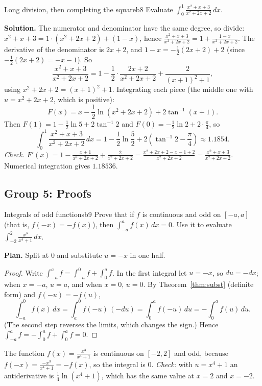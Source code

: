\documentclass[11pt]{article}
\begin{document}
\begin{exmp}{Long division, then completing the square}{b8}
Evaluate $\int_0^1\frac{x^2+x+3}{x^2+2x+2}\,dx$.

\textbf{Solution.} The numerator and denominator have the same degree, so divide: $x^2+x+3=1\cdot(x^2+2x+2)+(1-x)$, hence $\frac{x^2+x+3}{x^2+2x+2}=1+\frac{1-x}{x^2+2x+2}$. The derivative of the denominator is $2x+2$, and $1-x=-\frac12(2x+2)+2$ (since $-\frac12(2x+2)=-x-1$). So
\[\frac{x^2+x+3}{x^2+2x+2}=1-\frac12\cdot\frac{2x+2}{x^2+2x+2}+\frac2{(x+1)^2+1},\]
using $x^2+2x+2=(x+1)^2+1$. Integrating each piece (the middle one with $u=x^2+2x+2$, which is positive):
\[F(x)=x-\frac12\ln(x^2+2x+2)+2\tan^{-1}(x+1).\]
Then $F(1)=1-\frac12\ln5+2\tan^{-1}2$ and $F(0)=-\frac12\ln2+2\cdot\frac\pi4$, so
\[\int_0^1\frac{x^2+x+3}{x^2+2x+2}\,dx=1-\frac12\ln\frac52+2\left(\tan^{-1}2-\frac\pi4\right)\approx1.1854 .\]
\emph{Check.} $F'(x)=1-\frac{x+1}{x^2+2x+2}+\frac2{x^2+2x+2}=\frac{x^2+2x+2-x-1+2}{x^2+2x+2}=\frac{x^2+x+3}{x^2+2x+2}$. Numerical integration gives $1.18536$.
\end{exmp}

\subsection*{Group 5: Proofs}

\begin{exmp}{Integrals of odd functions}{b9}
Prove that if $f$ is continuous and odd on $[-a,a]$ (that is, $f(-x)=-f(x)$), then $\int_{-a}^af(x)\,dx=0$. Use it to evaluate $\int_{-2}^2\frac{x^3}{x^4+1}\,dx$.

\textbf{Plan.} Split at $0$ and substitute $u=-x$ in one half.

\begin{proof}
Write $\int_{-a}^af=\int_{-a}^0f+\int_0^af$. In the first integral let $u=-x$, so $du=-dx$; when $x=-a$, $u=a$, and when $x=0$, $u=0$. By Theorem~\ref{thm:subst} (definite form) and $f(-u)=-f(u)$,
\[\int_{-a}^0f(x)\,dx=\int_a^0f(-u)\,(-du)=\int_0^af(-u)\,du=-\int_0^af(u)\,du .\]
(The second step reverses the limits, which changes the sign.) Hence $\int_{-a}^af=-\int_0^af+\int_0^af=0$.
\end{proof}
The function $f(x)=\frac{x^3}{x^4+1}$ is continuous on $[-2,2]$ and odd, because $f(-x)=\frac{-x^3}{x^4+1}=-f(x)$, so the integral is $0$. \emph{Check:} with $u=x^4+1$ an antiderivative is $\frac14\ln(x^4+1)$, which has the same value at $x=2$ and $x=-2$.
\end{exmp}
\end{document}
